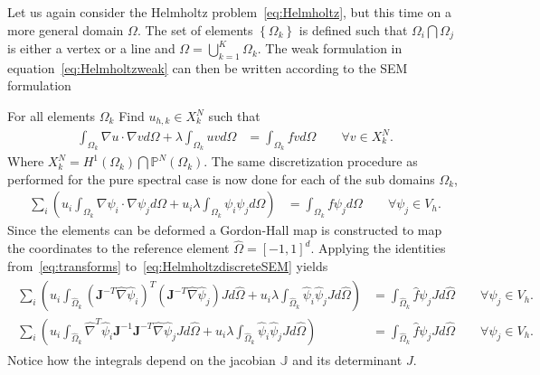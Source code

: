 Let us again consider the Helmholtz problem~\ref{eq:Helmholtz}, but this time 
on a more general domain $\Omega$. The set of elements $\left\{ \Omega_k \right\}$
is defined such that $\Omega_i\bigcap\Omega_j$ is either a vertex or a line and 
$\Omega = \bigcup^K_{k=1}\Omega_k$.
The weak formulation in equation~\ref{eq:Helmholtzweak} can then be written according 
to the SEM formulation

For all elements $\Omega_k$ Find $u_{h,k}\in X^N_k$  such that
%
\begin{align}
    \int_{\Omega_k}\nabla u \cdot \nabla v d \Omega + \lambda \int_{\Omega_k} u vd \Omega 
    &= \int_{\Omega_k}f vd \Omega \qquad \forall v \in X_k^N.
    \label{eq:HelmholtzweakSEM}
\end{align}
%
Where $X^N_k =  H^1(\Omega_k)\bigcap\mathbb{P}^N(\Omega_k)$. The same discretization 
procedure as performed for the pure spectral case is now done for each of the 
sub domains $\Omega_k$,
%
\begin{align}
    \sum_i\left(  u_i\int_{\Omega_k}\nabla \psi_i \cdot \nabla \psi_j d \Omega + 
    u_i\lambda \int_{\Omega_k} \psi_i \psi_jd \Omega \right)
    &= \int_{\Omega_k}f \psi_jd \Omega \qquad \forall \psi_j \in V_h.
    \label{eq:HelmholtzdiscreteSEM}
\end{align}
%
Since the elements can be deformed a Gordon-Hall map is 
constructed to map the coordinates to the reference element $\hat{\Omega}=[-1,1]^d$.
Applying the identities from~\ref{eq:transforms} to~\ref{eq:HelmholtzdiscreteSEM} yields
%
\begin{align}
    \begin{split}
    \sum_i\left(  u_i\int_{\hat{\Omega}_k}(\mathbf{J}^{-T}\hat{\nabla} \hat{\psi}_i)^T
    (\mathbf{J}^{-T}\hat{\nabla} \hat{\psi}_j) J d \hat{\Omega} + 
    u_i\lambda \int_{\hat{\Omega}_k} \hat{\psi}_i \hat{\psi}_j Jd \hat{\Omega} \right)
    &= \int_{\hat{\Omega}_k}\hat{f} \psi_j J d \hat{\Omega} \qquad \forall \psi_j \in V_h.  \\
    \sum_i\left(  u_i\int_{\hat{\Omega}_k}\hat{\nabla}^T \hat{\psi}_i\mathbf{J}^{-1}
    \mathbf{J}^{-T}\hat{\nabla} \hat{\psi}_j J d \hat{\Omega} + 
    u_i\lambda \int_{\hat{\Omega}_k} \hat{\psi}_i \hat{\psi}_j Jd \hat{\Omega} \right)
    &= \int_{\hat{\Omega}_k}\hat{f} \psi_j J d \hat{\Omega} \qquad \forall \psi_j \in V_h.
    \end{split}
    \label{eq:HelmholtzrefSEM}
\end{align}
%
Notice how the integrals depend on the jacobian $\mathbb{J}$ and its determinant $J$.

